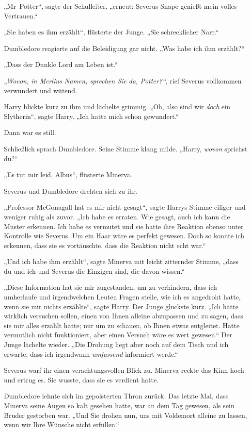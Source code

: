 {„Mr~Potter“, sagte der Schulleiter, „erneut: Severus Snape genießt mein volles Vertrauen.“

„Sie haben es ihm erzählt“, flüsterte der Junge. „Sie schrecklicher Narr.“

Dumbledore reagierte auf die Beleidigung gar nicht. „Was habe ich ihm erzählt?“

„Dass der Dunkle Lord am Leben ist.“

\emph{„Wovon, in Merlins Namen, sprechen Sie da, Potter?“}, rief Severus vollkommen verwundert und wütend.

Harry blickte kurz zu ihm und lächelte grimmig. „Oh, also sind wir \emph{doch} ein Slytherin“, sagte Harry. „Ich hatte mich schon gewundert.“

Dann war es still.

Schließlich sprach Dumbledore. Seine Stimme klang milde. „Harry, \emph{wovon} sprichst du?“

„Es tut mir leid, Albus“, flüsterte Minerva.

Severus und Dumbledore drehten sich zu ihr.

„Professor McGonagall hat es mir nicht gesagt“, sagte Harrys Stimme eiliger und weniger ruhig als zuvor. „Ich habe es erraten. Wie gesagt, auch ich kann die Muster erkennen. Ich habe es vermutet und sie hatte ihre Reaktion ebenso unter Kontrolle wie Severus. Um ein Haar wäre es perfekt gewesen. Doch so konnte ich erkennen, dass sie es vortäuschte, dass die Reaktion nicht echt war.“

„Und ich habe ihm erzählt“, sagte Minerva mit leicht zitternder Stimme, „dass du und ich und Severus die Einzigen sind, die davon wissen.“

„Diese Information hat sie mir zugestanden, um zu verhindern, dass ich umherlaufe und irgendwelchen Leuten Fragen stelle, wie ich es angedroht hatte, wenn sie mir nichts erzählte“, sagte Harry. Der Junge gluckste kurz. „Ich hätte wirklich versuchen sollen, einen von Ihnen alleine abzupassen und zu sagen, dass sie mir alles erzählt hätte; nur um zu schauen, ob Ihnen etwas entgleitet. Hätte vermutlich nicht funktioniert, aber einen Versuch wäre es wert gewesen.“ Der Junge lächelte wieder. „Die Drohung liegt aber noch auf dem Tisch und ich erwarte, dass ich irgendwann \emph{umfassend} informiert werde.“

Severus warf ihr einen verachtungsvollen Blick zu. Minerva reckte das Kinn hoch und ertrug es. Sie wusste, dass sie es verdient hatte.

Dumbledore lehnte sich im gepolsterten Thron zurück. Das letzte Mal, dass Minerva seine Augen so kalt gesehen hatte, war an dem Tag gewesen, als sein Bruder gestorben war. „Und Sie drohen nun, uns mit Voldemort alleine zu lassen, wenn wir Ihre Wünsche nicht erfüllen.“

}
